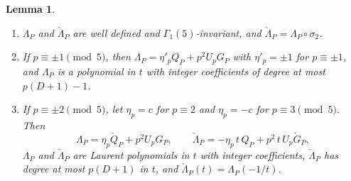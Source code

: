 \documentclass[11pt,a4paper]{article}
\newtheorem{lemma}[theorem]{Lemma}
\theoremstyle{definition}\newtheorem{definition}[theorem]{Definition}
\theoremstyle{remark}\newtheorem{remark}[theorem]{Remark}
\numberwithin{equation}{section}
\begin{document}
\begin{lemma}\label{B:lem:Dtrace}
\begin{enumerate}[label=\textup{(\alph*)}]
\item $\Lambda_P$ and $\check\Lambda_P$ are well defined and $\Gamma_1(5)$-invariant, and $\check\Lambda_P=\Lambda_P\circ\sigma_2$.
\item If $p\equiv\pm1\pmod5$, then $\Lambda_P=\eta'_pQ_P+p^2U_pG_P$ with $\eta'_p=\pm1$ for $p\equiv\pm1$, and
$\Lambda_P$ is a polynomial in $t$ with integer coefficients of degree at most $p(D+1)-1$.
\item If $p\equiv\pm2\pmod5$, let $\eta_p=c$ for $p\equiv2$ and $\eta_p=-c$ for $p\equiv3\pmod5$. Then
\[
\Lambda_P=\eta_p\check Q_P+p^2U_pG_P,\qquad \check\Lambda_P=-\eta_p\,t\,Q_P+p^2\,t\,U_p\check G_P,
\]
$\Lambda_P$ and $\check\Lambda_P$ are Laurent polynomials in $t$ with integer coefficients, $\check\Lambda_P$ has degree at
most $p(D+1)$ in $t$, and $\check\Lambda_P(t)=\Lambda_P(-1/t)$.
\end{enumerate}
\end{lemma}
\end{document}

